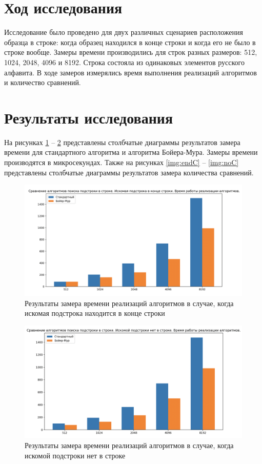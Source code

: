 \section{Ход исследования}
Исследование было проведено для двух различных сценариев расположения образца в строке: 
когда образец находился в конце строки и когда его не было в строке вообще. 
Замеры времени производились для строк разных размеров: 512, 1024, 2048, 4096 и 8192. 
Строка состояла из одинаковых элементов русского алфавита. 
В ходе замеров измерялись время выполнения реализаций алгоритмов и количество сравнений.

\section{Результаты исследования}

На рисунках \ref{img:endT} -- \ref{img:noT} представлены столбчатые диаграммы результатов замера времени для стандартного алгоритма и 
алгоритма Бойера-Мура. Замеры времени производятся в микросекундах. Также на рисунках \ref{img:endC} -- \ref{img:noC} представлены столбчатые диаграммы результатов замера 
количества сравнений.
\clearpage
\begin{figure}[h]
    \centering
    \includegraphics[width=1\linewidth]{img/endT.png}
    \caption{Результаты замера времени реализаций алгоритмов в случае, когда искомая подстрока находится в конце строки}
    \label{img:endT}
\end{figure}

\begin{figure}[h]
    \centering
    \includegraphics[width=1\linewidth]{img/noT.png}
    \caption{Результаты замера времени реализаций алгоритмов в случае, когда искомой подстроки нет в строке}
    \label{img:noT}
\end{figure}

